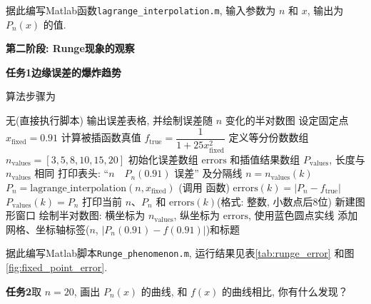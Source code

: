 \documentclass[zihao=-4,a4paper]{ctexart}
\begin{document}
据此编写Matlab函数\verb|lagrange_interpolation.m|, 输入参数为 $n$ 和 $x$, 输出为 $P_n(x)$ 的值.

\noindent\textbf{第二阶段: Runge现象的观察}

\noindent\textbf{任务1\quad 边缘误差的爆炸趋势}

算法步骤为
\begin{center}
    \begin{minipage}{0.8\textwidth}
      \begin{algorithm}[H]
      \caption{固定点 $x=0.91$ 处 Lagrange 插值误差随 $n$ 变化的实验}
      \begin{algorithmic}[1]
      \Require 无(直接执行脚本)
      \Ensure 输出误差表格, 并绘制误差随 $n$ 变化的半对数图
      \State 设定固定点 $x_{\text{fixed}} = 0.91$
      \State 计算被插函数真值 $f_{\text{true}} = \dfrac{1}{1+25x_{\text{fixed}}^2}$
      \State 定义等分份数数组 $n_{\text{values}} = [3, 5, 8, 10, 15, 20]$
      \State 初始化误差数组 $\text{errors}$ 和插值结果数组 $P_{\text{values}}$, 长度与 $n_{\text{values}}$ 相同
      \State 打印表头: “$n \quad P_n(0.91)$ \quad 误差” 及分隔线
          \State $n = n_{\text{values}}(k)$
          \State $P_n = \text{lagrange\_interpolation}(n, x_{\text{fixed}})$ \quad (调用  函数)
          \State $\text{errors}(k) = |P_n - f_{\text{true}}|$
          \State $P_{\text{values}}(k) = P_n$
          \State 打印当前 $n$、$P_n$ 和 $\text{errors}(k)$(格式: 整数, 小数点后8位)
      \EndFor
      \State 新建图形窗口
      \State 绘制半对数图: 横坐标为 $n_{\text{values}}$, 纵坐标为 $\text{errors}$, 使用蓝色圆点实线
      \State 添加网格、坐标轴标签($n$, $|P_n(0.91)-f(0.91)|$)和标题
      \end{algorithmic}
      \end{algorithm}
    \end{minipage}
\end{center}

据此编写Matlab脚本\verb|Runge_phenomenon.m|, 运行结果见表\ref{tab:runge_error} 和图\ref{fig:fixed_point_error}.

\noindent\textbf{任务2\quad }取 $n=20$, 画出 $P_n(x)$ 的曲线, 和 $f(x)$ 的曲线相比, 你有什么发现？
\end{document}
